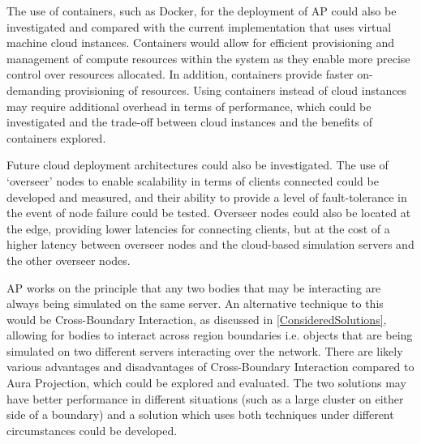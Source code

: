 The use of containers, such as Docker, for the deployment of AP could also be investigated and compared with the current implementation that uses virtual machine cloud instances. Containers would allow for efficient provisioning and management of compute resources within the system as they enable more precise control over resources allocated. In addition, containers provide faster on-demanding provisioning of resources. Using containers instead of cloud instances may require additional overhead in terms of performance, which could be investigated and the trade-off between cloud instances and the benefits of containers explored.

Future cloud deployment architectures could also be investigated. The use of `overseer' nodes to enable scalability in terms of clients connected could be developed and measured, and their ability to provide a level of fault-tolerance in the event of node failure could be tested. Overseer nodes could also be located at the edge, providing lower latencies for connecting clients, but at the cost of a higher latency between overseer nodes and the cloud-based simulation servers and the other overseer nodes.


AP works on the principle that any two bodies that may be interacting are always being simulated on the same server. An alternative technique to this would be Cross-Boundary Interaction, as discussed in \ref{ConsideredSolutions}, allowing for bodies to interact across region boundaries i.e. objects that are being simulated on two different servers interacting over the network. There are likely various advantages and disadvantages of Cross-Boundary Interaction compared to Aura Projection, which could be explored and evaluated. The two solutions may have better performance in different situations (such as a large cluster on either side of a boundary) and a solution which uses both techniques under different circumstances could be developed.

